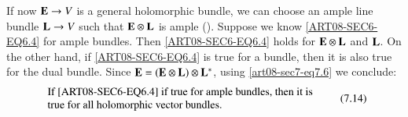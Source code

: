 If now $\mathbf{E}\to V$ is a general holomorphic bundle, we can choose an ample line bundle $\mathbf{L}\to V$ such that $\mathbf{E}\otimes \mathbf{L}$ is ample (\cite{art08-key11}). Suppose we know \eqref{ART08-SEC6-EQ6.4} for ample bundles. Then \eqref{ART08-SEC6-EQ6.4} holds for $\mathbf{E}\otimes\mathbf{L}$ and $\mathbf{L}$. On the other hand, if \eqref{ART08-SEC6-EQ6.4} is true for a bundle, then it is also true for the dual bundle. Since $\mathbf{E}=(\mathbf{E}\otimes \mathbf{L})\otimes \mathbf{L}^{*}$, using \eqref{art08-sec7-eq7.6} we conclude:
\begin{equation*}
\begin{array}{l}
\text{If \eqref{ART08-SEC6-EQ6.4} if true for ample bundles, then it is}\\
\text{true for all holomorphic vector bundles.}
\end{array}\tag{7.14}\label{art08-sec7-eq7.14}
\end{equation*}

